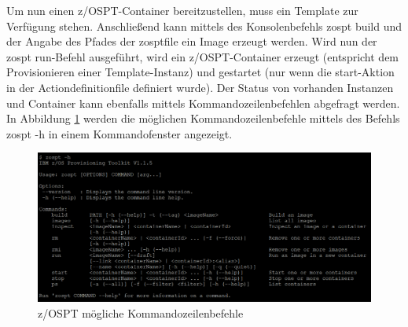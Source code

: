 Um nun einen z/OSPT-Container bereitzustellen, muss ein Template zur Verfügung stehen.
Anschließend kann mittels des Konsolenbefehls \glqq zospt build\grqq{} und der Angabe des Pfades der zosptfile ein Image erzeugt werden.
Wird nun der \glqq zospt run\grqq-Befehl ausgeführt, wird ein z/OSPT-Container erzeugt (entspricht dem Provisionieren einer Template-Instanz) und gestartet (nur wenn die start-Aktion in der Actiondefinitionfile definiert wurde).
Der Status von vorhanden Instanzen und Container kann ebenfalls mittels Kommandozeilenbefehlen abgefragt werden.
\cite{IBM.2019b}
In Abbildung \ref{fig:zospt_help} werden die möglichen Kommandozeilenbefehle mittels des Befehls \glqq zospt -h\grqq{} in einem Kommandofenster angezeigt. 
\begin{figure}[h]
	\centering
	\includegraphics[width=\textwidth]{figures/zospt_help_putty.png}
	\caption{z/OSPT mögliche Kommandozeilenbefehle}
	\label{fig:zospt_help}
\end{figure}
